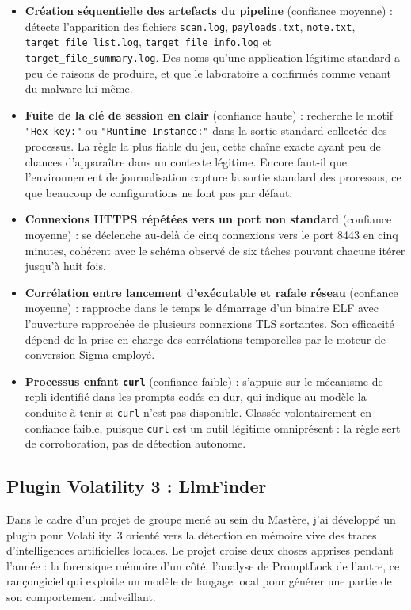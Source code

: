 \begin{itemize}
    \item \textbf{Création séquentielle des artefacts du pipeline} (confiance moyenne) : détecte l'apparition des fichiers \texttt{scan.log}, \texttt{payloads.txt}, \texttt{note.txt}, \texttt{target\_file\_list.log}, \texttt{target\_file\_info.log} et \texttt{target\_file\_summary.log}. Des noms qu'une application légitime standard a peu de raisons de produire, et que le laboratoire a confirmés comme venant du malware lui-même.
    \item \textbf{Fuite de la clé de session en clair} (confiance haute) : recherche le motif \texttt{"Hex key:"} ou \texttt{"Runtime Instance:"} dans la sortie standard collectée des processus. La règle la plus fiable du jeu, cette chaîne exacte ayant peu de chances d'apparaître dans un contexte légitime. Encore faut-il que l'environnement de journalisation capture la sortie standard des processus, ce que beaucoup de configurations ne font pas par défaut.
    \item \textbf{Connexions HTTPS répétées vers un port non standard} (confiance moyenne) : se déclenche au-delà de cinq connexions vers le port 8443 en cinq minutes, cohérent avec le schéma observé de six tâches pouvant chacune itérer jusqu'à huit fois.
    \item \textbf{Corrélation entre lancement d'exécutable et rafale réseau} (confiance moyenne) : rapproche dans le temps le démarrage d'un binaire ELF avec l'ouverture rapprochée de plusieurs connexions TLS sortantes. Son efficacité dépend de la prise en charge des corrélations temporelles par le moteur de conversion Sigma employé.
    \item \textbf{Processus enfant \texttt{curl}} (confiance faible) : s'appuie sur le mécanisme de repli identifié dans les prompts codés en dur, qui indique au modèle la conduite à tenir si \texttt{curl} n'est pas disponible. Classée volontairement en confiance faible, puisque \texttt{curl} est un outil légitime omniprésent : la règle sert de corroboration, pas de détection autonome.
\end{itemize}

\subsection{Plugin Volatility 3 : LlmFinder}

Dans le cadre d'un projet de groupe mené au sein du Mastère, j'ai développé un plugin
pour Volatility~3 orienté vers la détection en mémoire vive des traces d'intelligences
artificielles locales. Le projet croise deux choses apprises pendant l'année : la forensique mémoire d'un côté,
l'analyse de PromptLock de l'autre, ce rançongiciel qui exploite un modèle de langage
local pour générer une partie de son comportement malveillant.

